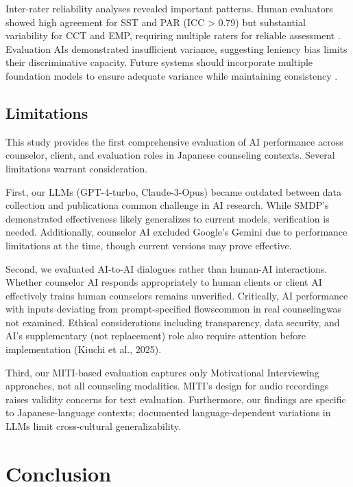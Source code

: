 \documentclass{wiley-article}
\begin{document}
Inter-rater reliability analyses revealed important patterns. Human evaluators showed high agreement for SST and PAR (ICC > 0.79) but substantial variability for CCT and EMP, requiring multiple raters for reliable assessment \citep{kooGuidelineSelectingReporting2016}. Evaluation AIs demonstrated insufficient variance, suggesting leniency bias limits their discriminative capacity. Future systems should incorporate multiple foundation models to ensure adequate variance while maintaining consistency \citep{morganLLMJuriesEvaluation2025}.

\subsection*{Limitations}

This study provides the first comprehensive evaluation of AI performance across counselor, client, and evaluation roles in Japanese counseling contexts. Several limitations warrant consideration.

First, our LLMs (GPT-4-turbo, Claude-3-Opus) became outdated between data collection and publication\textemdash{}a common challenge in AI research. While SMDP's demonstrated effectiveness likely generalizes to current models, verification is needed. Additionally, counselor AI excluded Google's Gemini due to performance limitations at the time, though current versions may prove effective.

Second, we evaluated AI-to-AI dialogues rather than human-AI interactions. Whether counselor AI responds appropriately to human clients or client AI effectively trains human counselors remains unverified. Critically, AI performance with inputs deviating from prompt-specified flows\textemdash{}common in real counseling\textemdash{}was not examined. Ethical considerations including transparency, data security, and AI's supplementary (not replacement) role also require attention before implementation (Kiuchi et al., 2025).

Third, our MITI-based evaluation captures only Motivational Interviewing approaches, not all counseling modalities. MITI's design for audio recordings raises validity concerns for text evaluation. Furthermore, our findings are specific to Japanese-language contexts; documented language-dependent variations in LLMs limit cross-cultural generalizability.




\section*{Conclusion}
\end{document}
